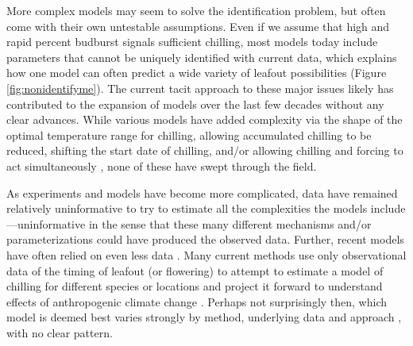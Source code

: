 \documentclass[11pt]{article}
\newcommand{\R}[1]{\label{#1}\linelabel{#1}}
\begin{document}
More complex models may seem to solve the identification problem, but often come with their own untestable assumptions. Even if we assume that high and rapid percent budburst signals sufficient chilling, most models today include parameters that cannot be uniquely identified with current data, which explains how one model can often predict a wide variety of leafout possibilities (Figure \ref{fig:nonidentifyme}). The current tacit approach to these major issues likely has contributed to the expansion of models over the last few decades without any clear advances. While various models have added complexity via the shape of the optimal temperature range for chilling, allowing accumulated chilling to be reduced, shifting the start date of chilling, and/or allowing chilling and forcing to act simultaneously \citep{hanninen1990modelling,Kramer1994,lued2009,pope2014biologically,gusewell2017}, none of these have swept through the field. %

As experiments and models have become more complicated, data have remained relatively uninformative to try to estimate all the complexities the models include---uninformative in the sense that these many different mechanisms and/or parameterizations could have produced the observed data.\R{r1clarifybyJA} Further, recent models have often relied on even less data \citep{hanninen2019experiments}. Many current methods use only observational data of the timing of leafout (or flowering) to attempt to estimate a model of chilling for different species or locations and project it forward to understand effects of anthropogenic climate change \citep{lued2011,luedeling2012climate,gao2024,fernandez2022unusually}. Perhaps not surprisingly then, which model is deemed best varies strongly by method, underlying data and approach \citep{Caffarra:2011qf,olsson2014process,basler2016evaluating,hufkens2018integrated}, with no clear pattern. 
\end{document}
